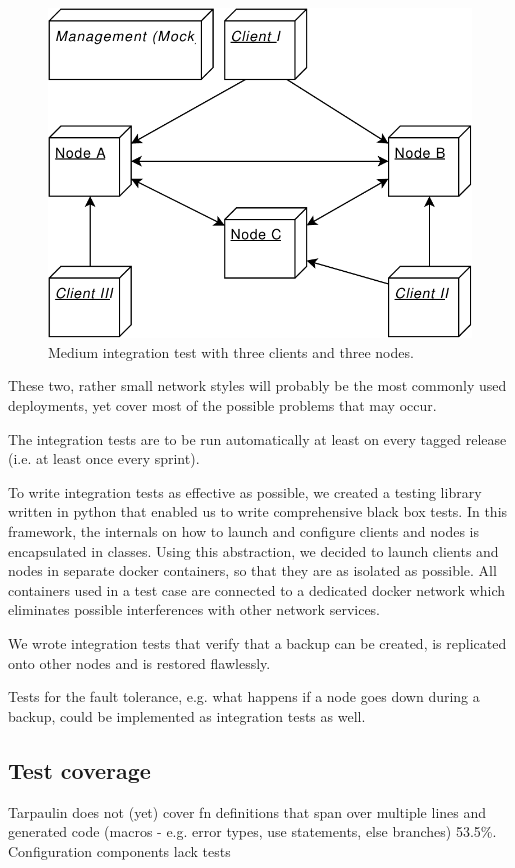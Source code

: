 \begin{figure}
	\centering
	\includegraphics[width=0.5\linewidth]{resources/integration_test_medium}
	\caption[Medium integration test]{Medium integration test with three clients and three nodes.}
	\label{fig:integrationtestmedium}
\end{figure}

These two, rather small network styles will probably be the most commonly used deployments, yet cover most of the possible problems that may occur.

The integration tests are to be run automatically at least on every tagged release (i.e. at least once every sprint).

To write integration tests as effective as possible, we created a testing library written in python that enabled us to write comprehensive black box tests. In this framework, the internals on how to launch and configure clients and nodes is encapsulated in classes. Using this abstraction, we decided to launch clients and nodes in separate docker containers, so that they are as isolated as possible. All containers used in a test case are connected to a dedicated docker network which eliminates possible interferences with other network services.

We wrote integration tests that verify that a backup can be created, is replicated onto other nodes and is restored flawlessly.

Tests for the fault tolerance, e.g. what happens if a node goes down during a backup, could be implemented as integration tests as well.

\subsection{Test coverage}
Tarpaulin does not (yet) cover fn definitions that span over multiple lines and generated code (macros - e.g. error types,  use statements, else branches) 53.5\%. Configuration components lack tests


